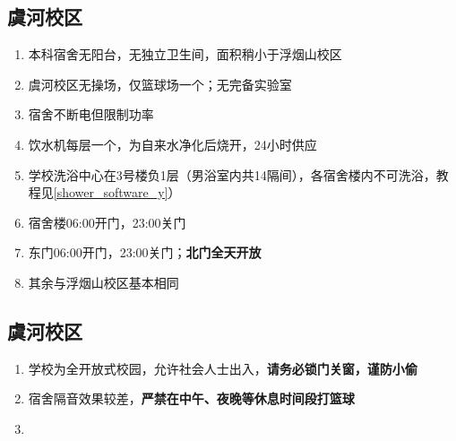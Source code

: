 \subsection[虞河校区]{虞河校区}
\begin{enumerate}
      \item 本科宿舍无阳台，无独立卫生间，面积稍小于浮烟山校区
      \item 虞河校区无操场，仅篮球场一个；无完备实验室
      \item 宿舍不断电但限制功率
      \item 饮水机每层一个，为自来水净化后烧开，24小时供应
      \item 学校洗浴中心在3号楼负1层（男浴室内共14隔间），各宿舍楼内不可洗浴，教程见\uline{\ref{shower_software_y}}）
      \item 宿舍楼06:00开门，23:00关门
      \item 东门06:00开门，23:00关门；\textbf{北门全天开放}
      \item 其余与浮烟山校区基本相同
\end{enumerate}


\subsection[虞河校区]{虞河校区}
\begin{enumerate}
      \item 学校为全开放式校园，允许社会人士出入，\textbf{请务必锁门关窗，谨防小偷}
      \item 宿舍隔音效果较差，\textbf{严禁在中午、夜晚等休息时间段打篮球}
      \item {}
\end{enumerate}